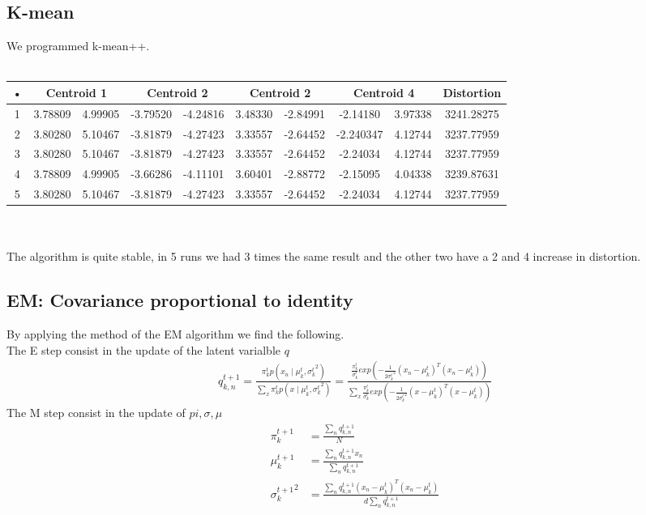 \documentclass[a4paper]{article}
\begin{document}
\subsection{K-mean}
We programmed k-mean++.\\\\
\begin{tabular}{|c|c|c|c|c|c|c|c|c|c|}
\hline 
• & \multicolumn{2}{c|}{Centroid 1} & \multicolumn{2}{c|}{Centroid 2} & \multicolumn{2}{c|}{Centroid 2} & \multicolumn{2}{c|}{Centroid 4} & Distortion \\ 
\hline 
1 & 3.78809 & 4.99905 & -3.79520 & -4.24816 &  3.48330 & -2.84991 & -2.14180 & 3.97338 & 3241.28275 \\ 
\hline 
2 &  3.80280 & 5.10467 & -3.81879 & -4.27423 & 3.33557 & -2.64452 & -2.240347  & 4.12744 & 3237.77959 \\ 
\hline 
3 &  3.80280 & 5.10467 & -3.81879 & -4.27423 & 3.33557 & -2.64452 & -2.24034 & 4.12744 & 3237.77959 \\ 
\hline 
4 &  3.78809 & 4.99905 & -3.66286 & -4.11101 & 3.60401 & -2.88772 & -2.15095 & 4.04338 & 3239.87631 \\ 
\hline
5 &  3.80280 & 5.10467 & -3.81879 & -4.27423 & 3.33557 & -2.64452 & -2.24034 & 4.12744 & 3237.77959 \\ 
\hline 
\end{tabular}
\\\\
The algorithm is quite stable, in 5 runs we had 3 times the same result and the other two have a 2 and 4 increase in distortion.
\subsection{EM: Covariance proportional to identity}
By applying the method of the EM algorithm we find the following.\\
The E step consist in the update of the latent varialble $q$
\begin{align*}
q^{t+1}_{k,n} = \frac{\pi_k^t p(x_n \mid \mu_k^t, {\sigma_k^t}^2)}{\sum_{x} \pi_k^t p(x \mid \mu_k^t, {\sigma_k^t}^2)} =
\frac{\frac{\pi_k^t}{\sigma_k^t} exp(-\frac{1}{2{\sigma_k^t}^2}(x_n-\mu_k^t)^T(x_n - \mu_k^t))}{\sum_{x} \frac{\pi_k^t}{\sigma_k^t} exp(-\frac{1}{2{\sigma_k^t}^2}(x-\mu_k^t)^T(x-\mu_k^t))}
\end{align*}
The M step consist in the update of $pi, \sigma, \mu$
\begin{align*}
\pi_k^{t+1} &= \frac{\sum_n q^{t+1}_{k,n}}{N} \\
\mu_k^{t+1} &= \frac{\sum_n q^{t+1}_{k,n}x_n}{\sum_n q^{t+1}_{k,n}}\\
{\sigma_k^{t+1}}^2 &= \frac{\sum_n q^{t+1}_{k,n}(x_n-\mu_k^t)^T(x_n - \mu_k^t)}{d\sum_n q^{t+1}_{k,n}}
\end{align*}
\end{document}
